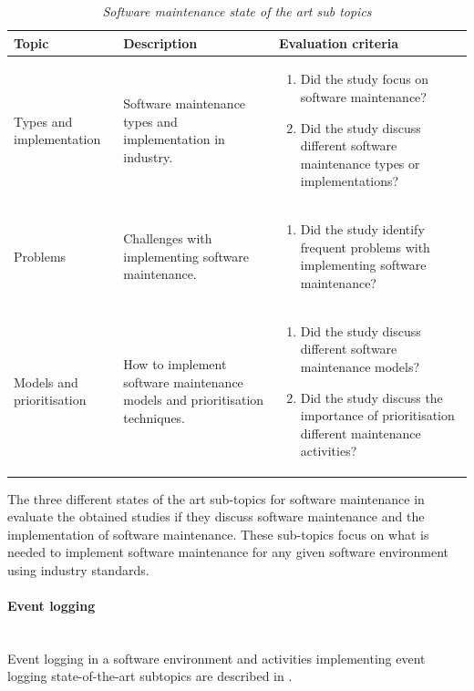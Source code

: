 \begin{table}[!htb]
	\centering
	\caption[Software maintenance state of the art sub topics]
	{\textit{Software maintenance state of the art sub topics}}
	\label{tbl:ch1_soaSoftwareMaintennace}
	\begin{tabularx}{\linewidth}{|l|X|X|}
		\hline \textbf{Topic}  & \textbf{Description} & \textbf{Evaluation criteria}\\
		\hline Types and implementation & \RaggedRight Software maintenance types and implementation in industry. & \RaggedRight \begin{enumerate}
			\item Did the study focus on software maintenance?
			\item Did the study discuss different software maintenance types or implementations?
		\end{enumerate} \\
		\hline Problems & Challenges with implementing software maintenance. & \RaggedRight \begin{enumerate}
			\item Did the study identify frequent problems with implementing software maintenance?
		\end{enumerate}\\
		\hline Models and prioritisation & How to implement software maintenance models and prioritisation techniques. & \RaggedRight \begin{enumerate}
			\item Did the study discuss different software maintenance models?
			\item Did the study discuss the importance of prioritisation different maintenance activities?
		\end{enumerate} \\
		\hline
	\end{tabularx}
\end{table}

\clearpage

The three different states of the art sub-topics for software maintenance in  evaluate the obtained studies if they discuss software maintenance and the implementation of software maintenance. These sub-topics focus on what is needed to implement software maintenance for any given software environment using industry standards.

\paragraph{Event logging} \leavevmode\\
Event logging in a software environment and activities implementing event logging state-of-the-art subtopics are described in .


